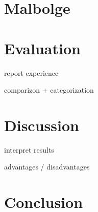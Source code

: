 \documentclass{sig-alternate}
\begin{document}
\section{Malbolge}

\section{Evaluation}

report experience


comparizon + categorization

\section{Discussion}

interpret results

advantages / disadvantages

\section{Conclusion}

\blindtext[2]

\cite{why05}
\cite{google13}



\end{document}
